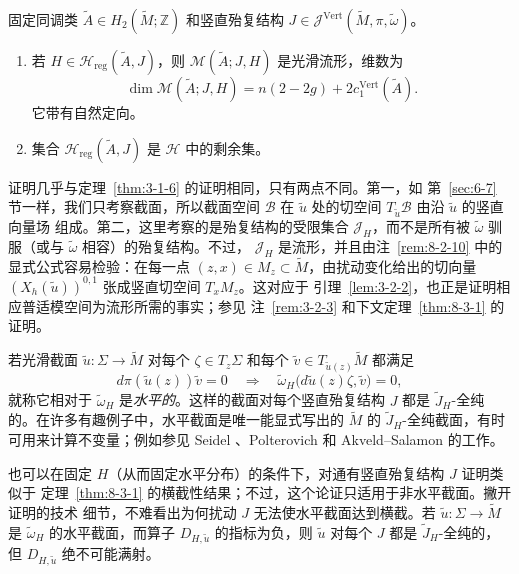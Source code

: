 \begin{theorem}\label{thm:8-3-1}
固定同调类 $\widetilde A\in H_2(\widetilde M;\mathbb Z)$ 和竖直殆复结构
$J\in\mathcal J^{\mathrm{Vert}}(\widetilde M,\pi,\widetilde\omega)$。
\begin{enumerate}[label=\textup{(\roman*)},leftmargin=3em]
\item 若 $H\in\mathcal H_{\mathrm{reg}}(\widetilde A,J)$，则
$\mathcal M(\widetilde A;J,H)$ 是光滑流形，维数为
\[
  \dim\mathcal M(\widetilde A;J,H)
  =n(2-2g)+2c_1^{\mathrm{Vert}}(\widetilde A).
\]
它带有自然定向。
\item 集合 $\mathcal H_{\mathrm{reg}}(\widetilde A,J)$ 是 $\mathcal H$ 中的剩余集。
\end{enumerate}
\end{theorem}


证明几乎与定理~\ref{thm:3-1-6} 的证明相同，只有两点不同。第一，如
第~\ref{sec:6-7} 节一样，我们只考察截面，所以截面空间 $\mathcal B$ 在
$\widetilde u$ 处的切空间 $T_{\widetilde u}\mathcal B$ 由沿 $\widetilde u$ 的竖直向量场
组成。第二，这里考察的是殆复结构的受限集合 $\mathcal J_H$，而不是所有被
$\widetilde\omega$ 驯服（或与 $\widetilde\omega$ 相容）的殆复结构。不过，
$\mathcal J_H$ 是流形，并且由注~\ref{rem:8-2-10} 中的显式公式容易检验：在每一点
$(z,x)\in M_z\subset\widetilde M$，由扰动变化给出的切向量
$(X_h(\widetilde u))^{0,1}$ 张成竖直切空间 $T_xM_z$。这对应于
引理~\ref{lem:3-2-2}，也正是证明相应普适模空间为流形所需的事实；参见
注~\ref{rem:3-2-3} 和下文定理~\ref{thm:8-3-1} 的证明。

\begin{remark}\label{rem:8-3-2}
若光滑截面 $\widetilde u:\Sigma\to\widetilde M$ 对每个
$\zeta\in T_z\Sigma$ 和每个 $\widetilde v\in T_{\widetilde u(z)}\widetilde M$ 都满足
\[
  d\pi(\widetilde u(z))\widetilde v=0
  \quad\Longrightarrow\quad
  \widetilde\omega_H\bigl(d\widetilde u(z)\zeta,\widetilde v\bigr)=0,
\]
就称它相对于 $\widetilde\omega_H$ 是\emph{水平的}。这样的截面对每个竖直殆复结构
$J$ 都是 $\widetilde J_H$-全纯的。在许多有趣例子中，水平截面是唯一能显式写出的
$\widetilde M$ 的 $\widetilde J_H$-全纯截面，有时可用来计算不变量；例如参见 Seidel
、Polterovich  和 Akveld--Salamon  的工作。

也可以在固定 $H$（从而固定水平分布）的条件下，对通有竖直殆复结构 $J$ 证明类似于
定理~\ref{thm:8-3-1} 的横截性结果；不过，这个论证只适用于非水平截面。撇开证明的技术
细节，不难看出为何扰动 $J$ 无法使水平截面达到横截。若
$\widetilde u:\Sigma\to\widetilde M$ 是 $\widetilde\omega_H$ 的水平截面，而算子
$D_{H,\widetilde u}$ 的指标为负，则 $\widetilde u$ 对每个 $J$ 都是
$\widetilde J_H$-全纯的，但 $D_{H,\widetilde u}$ 绝不可能满射。
\end{remark}

